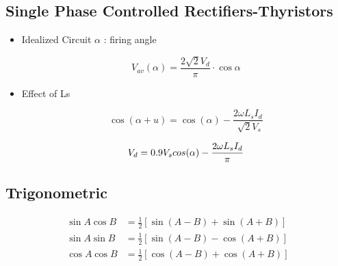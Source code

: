 \documentclass[twocolumn, ]{article}
\begin{document}
\subsection*{\small Single Phase Controlled Rectifiers-Thyristors}

\begin{itemize}
\item {Idealized Circuit} $\alpha$ : firing angle

\begin{equation*}
	V_{av}(\alpha)=\frac{2 \sqrt{2} V_{d}}{\pi } \cdot \cos{\alpha}
\end{equation*}

\item {Effect of Ls}

\begin{equation*}
	\cos(\alpha + u)=\cos(\alpha)-\dfrac{2\omega L_{s} I_{d}}{\sqrt[]{2}V_{s}}
\end{equation*}

\begin{equation*}
	V_d = 0.9 V_s cos(\alpha) - \dfrac{2\omega L_s I_d}{\pi} \\
\end{equation*}





\end{itemize}


\subsection*{ \small Trigonometric }

\begin{align*}
          \sin A \cos B &= \frac{1}{2}\left[ \sin(A-B)+\sin(A+B) \right] \\
          \sin A \sin B &= \frac{1}{2}\left[ \sin(A-B)-\cos(A+B) \right] \\
          \cos A \cos B &= \frac{1}{2}\left[ \cos(A-B)+\cos(A+B) \right] \\         
\end{align*}
\end{document}
